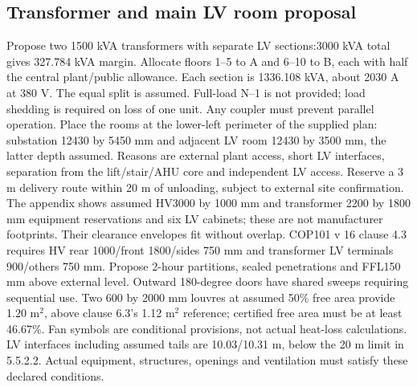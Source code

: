 \subsection*{Transformer and main LV room proposal}
Propose two 1500 kVA transformers with separate LV sections:3000 kVA total gives 327.784 kVA margin. Allocate floors 1--5 to A and 6--10 to B, each with half the central plant/public allowance. Each section is 1336.108 kVA, about 2030 A at 380 V. The equal split is assumed. Full-load N--1 is not provided;  load shedding is required on loss of one unit. Any coupler must prevent parallel operation.
Place the rooms at the lower-left perimeter of the supplied plan: substation 12430 by 5450 mm and adjacent LV room 12430 by 3500 mm, the latter depth assumed. Reasons are external plant access, short LV interfaces, separation from the lift/stair/AHU core and independent LV access. Reserve a 3 m delivery route within 20 m of unloading, subject to external site confirmation.
The appendix shows assumed HV3000 by 1000 mm and transformer 2200 by 1800 mm equipment reservations and six LV cabinets;  these are not manufacturer footprints. Their clearance envelopes fit without overlap. COP101 v 16 clause 4.3 requires HV rear 1000/front 1800/sides 750 mm and transformer LV terminals 900/others 750 mm. Propose 2-hour partitions, sealed penetrations and FFL150 mm above external level. Outward 180-degree doors have shared sweeps requiring sequential use.
Two 600 by 2000 mm louvres at assumed 50\% free area provide 1.20 m$^2$, above clause 6.3's 1.12 m$^2$ reference;  certified free area must be at least 46.67\%. Fan symbols are conditional provisions, not actual heat-loss calculations. LV interfaces including assumed tails are 10.03/10.31 m, below the 20 m limit in 5.5.2.2. Actual equipment, structures, openings and ventilation must satisfy these declared conditions.
